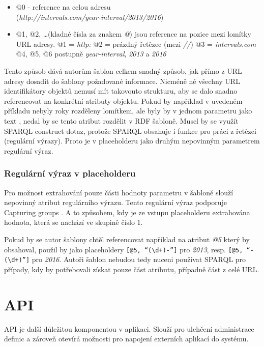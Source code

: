 \documentclass[thesis=B,czech]{FITthesis}[2012/06/26]
\begin{document}
 \begin{itemize}
  \item @0 - reference na celou adresu\\(\textit{http://intervals.com/year-interval/2013/2016})
  \item @1, @2, \ldots (kladné čísla za znakem \textit{@}) jsou reference na pozice mezi lomítky URL adresy.
    \subitem @1 = \textit{http:}
    \subitem @2 = prázdný řetězec (mezi \textit{//})
    \subitem @3 = \textit{intervals.com}
    \subitem @4, @5, @6 postupně \textit{year-interval}, \textit{2013} a \textit{2016}
 \end{itemize}
 Tento způsob dává autorům šablon celkem snadný způsob, jak přímo z URL adresy dosadit do šablony požadované informace. Nicméně né všechny URL identifikátory objektů
 nemusí mít takovouto strukturu, aby se dalo snadno referencovat na konkrétní atributy objektu. Pokud by například v uvedeném příkladu nebyly roky rozděleny lomítkem,
 ale byly by v jednom parametru jako text , nedal by se tento atribut rozdělit v RDF šabloně. Musel by se využít SPARQL construct dotaz, protože
 SPARQL obsahuje i funkce pro práci z řetězci (regulární výrazy). Proto je v placeholderu jako druhým nepovinným parametrem regulární výraz.
 
 \subsubsection{Regulární výraz v placeholderu}
  Pro možnost extrahování pouze části hodnoty parametru v šabloně slouží nepovinný atribut regulárního výrazu. Tento regulární výraz
  podporuje Capturing groups \cite{capture_group}. A to způsobem, kdy je ze vstupu placeholderu extrahována hodnota, která se nachází ve skupině číslo 1.
  
  Pokud by se autor šablony chtěl referencovat například na atribut \textit{@5} který by obsahoval, 
  použil by jako placeholdery \texttt{[@5, ``(\textbackslash d+)-'']} pro \textit{2013}, resp. \texttt{[@5, ``-(\textbackslash d+)'']} pro \textit{2016}.
  Autoři šablon nebudou tedy nuceni používat SPARQL pro případy, kdy by potřebovali získat pouze část atributu, případně část z celé URL.
  
  \section{API}\label{api}
  API je další důležitou komponentou v aplikaci. Slouží pro ulehčení administrace definic a zároveň otevírá možnosti pro napojení externích
  aplikací do systému. 
  
\end{document}
